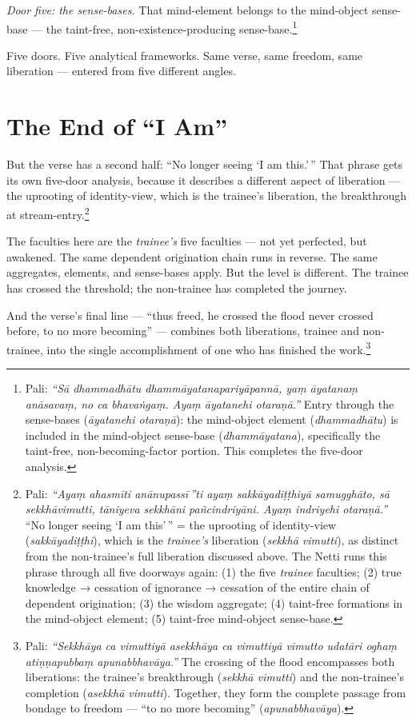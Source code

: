 \textit{Door five: the sense-bases.} That mind-element belongs to the mind-object sense-base --- the taint-free, non-existence-producing sense-base.\footnote{Pali: \textit{``Sā dhammadhātu dhammāyatanapariyāpannā, yaṃ āyatanaṃ anāsavaṃ, no ca bhavaṅgaṃ. Ayaṃ āyatanehi otaraṇā.''} Entry through the sense-bases (\textit{āyatanehi otaraṇā}): the mind-object element (\textit{dhammadhātu}) is included in the mind-object sense-base (\textit{dhammāyatana}), specifically the taint-free, non-becoming-factor portion. This completes the five-door analysis.}

Five doors. Five analytical frameworks. Same verse, same freedom, same liberation --- entered from five different angles.

\section*{The End of ``I Am''}

But the verse has a second half: ``No longer seeing `I am this.'\,'' That phrase gets its own five-door analysis, because it describes a different aspect of liberation --- the uprooting of identity-view, which is the trainee's liberation, the breakthrough at stream-entry.\footnote{Pali: \textit{``Ayaṃ ahasmīti anānupassī\,''ti ayaṃ sakkāyadiṭṭhiyā samugghāto, sā sekkhāvimutti, tāniyeva sekkhāni pañcindriyāni. Ayaṃ indriyehi otaraṇā.''} ``No longer seeing `I am this'\,'' = the uprooting of identity-view (\textit{sakkāyadiṭṭhi}), which is the \textit{trainee's} liberation (\textit{sekkhā vimutti}), as distinct from the non-trainee's full liberation discussed above. The Netti runs this phrase through all five doorways again: (1) the five \textit{trainee} faculties; (2) true knowledge → cessation of ignorance → cessation of the entire chain of dependent origination; (3) the wisdom aggregate; (4) taint-free formations in the mind-object element; (5) taint-free mind-object sense-base.}

The faculties here are the \textit{trainee's} five faculties --- not yet perfected, but awakened. The same dependent origination chain runs in reverse. The same aggregates, elements, and sense-bases apply. But the level is different. The trainee has crossed the threshold; the non-trainee has completed the journey.

And the verse's final line --- ``thus freed, he crossed the flood never crossed before, to no more becoming'' --- combines both liberations, trainee and non-trainee, into the single accomplishment of one who has finished the work.\footnote{Pali: \textit{``Sekkhāya ca vimuttiyā asekkhāya ca vimuttiyā vimutto udatāri oghaṃ atiṇṇapubbaṃ apunabbhavāya.''} The crossing of the flood encompasses both liberations: the trainee's breakthrough (\textit{sekkhā vimutti}) and the non-trainee's completion (\textit{asekkhā vimutti}). Together, they form the complete passage from bondage to freedom --- ``to no more becoming'' (\textit{apunabbhavāya}).}

